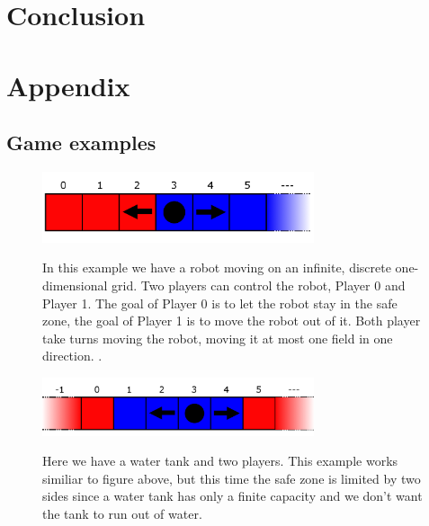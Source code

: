 \documentclass[10pt,a4paper]{article}
\theoremstyle{plain}
\theoremstyle{definition}
\begin{document}
\section{Conclusion}
\newpage
\section{Appendix}
\subsection{Game examples}
\begin{figure}[h] \label{Laufband}
  \caption{In this example we have a robot moving on an infinite, discrete one-dimensional grid. Two players can control the robot, Player 0 and Player 1. The goal of Player 0 is to let the robot stay in the safe zone, the goal of Player 1 is to move the robot out of it. Both player take turns moving the robot, moving it at most one field in one direction.
.}
  \centering
    {\includegraphics[width=8.0cm]{laufband.png}} 

\end{figure}


\begin{figure}[h]\label{Wassertank}
  \caption{Here we have a water tank and two players. This example works similiar to figure above, but this time the safe zone is limited by two sides since a water tank has only a finite capacity and we don't want the tank to run out of water.
}
  \centering
    {\includegraphics[width=8.0cm]{wasser_tank.png}} 
\end{figure}
\end{document}
